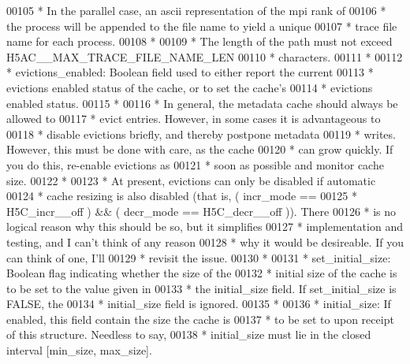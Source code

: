 \begin{DoxyCode}
00105 \textcolor{comment}{ *  In the parallel case, an ascii representation of the mpi rank of}
00106 \textcolor{comment}{ *  the process will be appended to the file name to yield a unique}
00107 \textcolor{comment}{ *  trace file name for each process.}
00108 \textcolor{comment}{ *}
00109 \textcolor{comment}{ *  The length of the path must not exceed H5AC\_\_MAX\_TRACE\_FILE\_NAME\_LEN}
00110 \textcolor{comment}{ *  characters.}
00111 \textcolor{comment}{ *}
00112 \textcolor{comment}{ * evictions\_enabled:  Boolean field used to either report the current}
00113 \textcolor{comment}{ *  evictions enabled status of the cache, or to set the cache's}
00114 \textcolor{comment}{ *  evictions enabled status.}
00115 \textcolor{comment}{ *}
00116 \textcolor{comment}{ *  In general, the metadata cache should always be allowed to}
00117 \textcolor{comment}{ *  evict entries.  However, in some cases it is advantageous to}
00118 \textcolor{comment}{ *  disable evictions briefly, and thereby postpone metadata}
00119 \textcolor{comment}{ *  writes.  However, this must be done with care, as the cache}
00120 \textcolor{comment}{ *  can grow quickly.  If you do this, re-enable evictions as}
00121 \textcolor{comment}{ *  soon as possible and monitor cache size.}
00122 \textcolor{comment}{ *}
00123 \textcolor{comment}{ *  At present, evictions can only be disabled if automatic}
00124 \textcolor{comment}{ *  cache resizing is also disabled (that is, ( incr\_mode ==}
00125 \textcolor{comment}{ *  H5C\_incr\_\_off ) && ( decr\_mode == H5C\_decr\_\_off )).  There}
00126 \textcolor{comment}{ *  is no logical reason why this should be so, but it simplifies}
00127 \textcolor{comment}{ *  implementation and testing, and I can't think of any reason}
00128 \textcolor{comment}{ *  why it would be desireable.  If you can think of one, I'll}
00129 \textcolor{comment}{ *  revisit the issue.}
00130 \textcolor{comment}{ *}
00131 \textcolor{comment}{ * set\_initial\_size: Boolean flag indicating whether the size of the}
00132 \textcolor{comment}{ *      initial size of the cache is to be set to the value given in}
00133 \textcolor{comment}{ *      the initial\_size field.  If set\_initial\_size is FALSE, the}
00134 \textcolor{comment}{ *      initial\_size field is ignored.}
00135 \textcolor{comment}{ *}
00136 \textcolor{comment}{ * initial\_size: If enabled, this field contain the size the cache is}
00137 \textcolor{comment}{ *      to be set to upon receipt of this structure.  Needless to say,}
00138 \textcolor{comment}{ *      initial\_size must lie in the closed interval [min\_size, max\_size].}

\end{DoxyCode}

